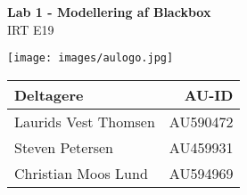 \begin{titlepage}
   \begin{center}
       \vspace*{3cm}
        
       \Huge
       \textbf{Lab 1 - Modellering af Blackbox}  \\%

        \Large
       \vspace{0.5cm}
        IRT E19\\
        \vspace{0.5cm}
        \vspace{9cm}
 
\texttt{[image: images/aulogo.jpg]} 
 
 
       \vspace{1.5cm}
        \normalsize
        \begin{tabular}{lr}
           \begin{minipage}[t]{7CM} \textbf{Deltagere} \vspace{2mm}\end{minipage}  &  \textbf{AU-ID}\\
            \toprule
            Laurids Vest Thomsen &  AU590472\\
            Steven Petersen      &  AU459931\\
            Christian Moos Lund  &  AU594969\\
            \bottomrule
        \end{tabular}
 
       \vfill

       \vspace{0.8cm}
   \end{center}
\thispagestyle{empty}
\end{titlepage}
\newpage
